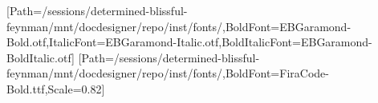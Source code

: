 \usepackage{fontspec}
\usepackage{anyfontsize}
\setmainfont{EBGaramond-Regular.otf}[Path=/sessions/determined-blissful-feynman/mnt/docdesigner/repo/inst/fonts/,BoldFont=EBGaramond-Bold.otf,ItalicFont=EBGaramond-Italic.otf,BoldItalicFont=EBGaramond-BoldItalic.otf]
\setmonofont{FiraCode-Regular.ttf}[Path=/sessions/determined-blissful-feynman/mnt/docdesigner/repo/inst/fonts/,BoldFont=FiraCode-Bold.ttf,Scale=0.82]
\usepackage{xcolor}
\color{text}
\usepackage[explicit]{titlesec}
\titlespacing*{\section}{0pt}{1.7em}{0.5em}
\titlespacing*{\subsection}{0pt}{1.1em}{0.3em}
\titlespacing*{\subsubsection}{0pt}{0.9em}{0.2em}
\usepackage{titling}
\pretitle{\begin{flushleft}\fontsize{28.6}{31.5}\selectfont\bfseries\color{accent}}
\posttitle{\par\end{flushleft}\vskip0.4em}
\preauthor{\begin{flushleft}\large\color{muted}}
\postauthor{\end{flushleft}}
\predate{\begin{flushleft}\color{muted}}
\postdate{\end{flushleft}}
\usepackage{microtype}
\usepackage{booktabs}
\renewcommand{\arraystretch}{1.2}
\setlength{\parindent}{0pt}
\setlength{\parskip}{0.5em}
\linespread{1.3}
\usepackage{fancyhdr}\pagestyle{fancy}\fancyhf{}
\renewcommand{\headrulewidth}{0pt}\renewcommand{\footrulewidth}{0.4pt}
\fancyfoot[R]{\small\color{muted}\thepage}